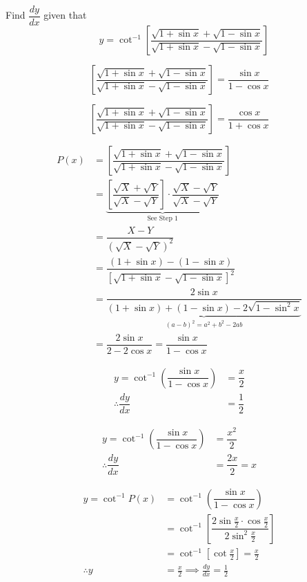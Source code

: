 \documentclass[14pt,fleqn]{extarticle}
\begin{document}
Find $\dfrac{dy}{dx}$ given that 
\[\quad  y = \cot^{-1}\left[ \dfrac{\sqrt{1+\sin x} + \sqrt{1-\sin x}}{\sqrt{1+\sin x} - \sqrt{1-\sin x}}\right] \]
%

\newcard


\[ \left[ \dfrac{\sqrt{1+\sin x} + \sqrt{1-\sin x}}{\sqrt{1+\sin x} - \sqrt{1-\sin x}}\right] = \dfrac{\sin x}{1-\cos x}\]

\newcard


\[ \left[ \dfrac{\sqrt{1+\sin x} + \sqrt{1-\sin x}}{\sqrt{1+\sin x} - \sqrt{1-\sin x}}\right] = \dfrac{\cos x}{1+\cos x}\]

\newcard

\begin{align}
P(x) &= \left[ \dfrac{\sqrt{1+\sin x} + \sqrt{1-\sin x}}{\sqrt{1+\sin x} - \sqrt{1-\sin x}}\right] \\
&= \underbrace{\left[ \dfrac{\sqrt{X} + \sqrt{Y}}{\sqrt{X} - \sqrt{Y}} \right]\cdot
\dfrac{\sqrt{X}-\sqrt{Y}}{\sqrt{X}-\sqrt{Y}}}_{\text{See Step 1}} \\
&= \dfrac{X-Y}{(\sqrt{X} - \sqrt{Y})^2} \\
&= \dfrac{(1+\sin x) - (1-\sin x)}{\left[ \sqrt{1+\sin x} - \sqrt{1-\sin x}\right]^2} \\
&= \dfrac{2\sin x}{\underbrace{(1+\sin x) + (1-\sin x) -2\sqrt{1-\sin^2 x}}_{(a-b)^2 = a^2+b^2-2ab}}\\
&= \dfrac{2\sin x}{2-2\cos x} = \dfrac{\sin x}{1-\cos x}
\end{align}

\newcard

\begin{align}
 y = \cot^{-1} \left(  \dfrac{\sin x}{1-\cos x} \right)&= \dfrac{x}{2}  \\
 \therefore \dfrac{dy}{dx} &= \dfrac{1}{2}
\end{align}


\newcard

\begin{align}
 y = \cot^{-1} \left(\dfrac{\sin x}{1-\cos x} \right) &= \dfrac{x^2}{2} \\
 \therefore \dfrac{dy}{dx} &= \dfrac{2x}{2} = x 
\end{align}

\newcard

\begin{align}
y = \cot^{-1} P(x) &= \cot^{-1} \left( \dfrac{\sin x}{1-\cos x}\right)  \\
&= \cot^{-1}\left[\dfrac{2\sin\frac{x}{2}\cdot\cos\frac{x}{2}}
{2\sin^2\frac{x}{2}}\right] \\
&= \cot^{-1}\left[ \cot\frac{x}{2}\right] = \frac{x}{2} \\
\therefore y &= \frac{x}{2} \implies \frac{dy}{dx} = \frac{1}{2}
\end{align}
\end{document}
